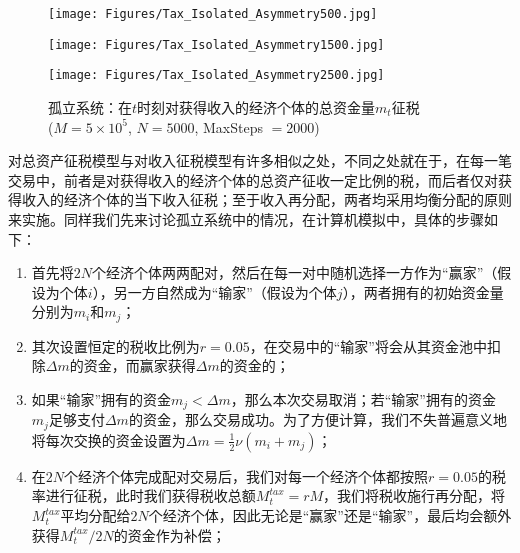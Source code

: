 \documentclass[tsinghuacite]{HustGraduPaper}
\begin{document}
		\begin{figure}[htbp]
			\centering                                                 
			\begin{minipage}[t]{0.49\textwidth}                                                      
			\texttt{[image: Figures/Tax\_Isolated\_Asymmetry500.jpg]}               
			\end{minipage}
			\begin{minipage}[t]{0.49\textwidth}                 
			\texttt{[image: Figures/Tax\_Isolated\_Asymmetry1500.jpg]}               
			\end{minipage}
			
			\begin{minipage}[t]{0.49\textwidth}                 
			\texttt{[image: Figures/Tax\_Isolated\_Asymmetry2500.jpg]}               
			\end{minipage}

			\caption{孤立系统：在$t$时刻对获得收入的经济个体的总资金量$m_t$征税 \\ ($M = 5 \times 10^5$, $N = 5000$, MaxSteps $= 2000$)} 
			\label{fig:Tax_Isolated_Asymmetry}                                                        
		\end{figure}
		
		对总资产征税模型与对收入征税模型有许多相似之处，不同之处就在于，在每一笔交易中，前者是对获得收入的经济个体的总资产征收一定比例的税，而后者仅对获得收入的经济个体的当下收入征税；至于收入再分配，两者均采用均衡分配的原则来实施。同样我们先来讨论孤立系统中的情况，在计算机模拟中，具体的步骤如下：
		
		\begin{enumerate}[label=(\roman*)]
			\item 首先将$2N$个经济个体两两配对，然后在每一对中随机选择一方作为“赢家”（假设为个体$i$），另一方自然成为“输家”（假设为个体$j$），两者拥有的初始资金量分别为$m_i$和$m_j$；
			
			\item 其次设置恒定的税收比例为$r=0.05$，在交易中的“输家”将会从其资金池中扣除$\Delta m$的资金，而赢家获得$\Delta m$的资金的；
			
			\item 如果“输家”拥有的资金$m_{j} < \Delta m$，那么本次交易取消；若“输家”拥有的资金$m_j$足够支付$\Delta m$的资金，那么交易成功。为了方便计算，我们不失普遍意义地将每次交换的资金设置为$\Delta m =  \frac{1}{2} \nu (m_i + m_j)$；
			
			\item 在$2N$个经济个体完成配对交易后，我们对每一个经济个体都按照$r=0.05$的税率进行征税，此时我们获得税收总额$M_t^{tax} = r M$，我们将税收施行再分配，将$M_t^{tax}$平均分配给$2N$个经济个体，因此无论是“赢家”还是“输家”，最后均会额外获得$M_t^{tax}/2N$的资金作为补偿；
			
		\end{enumerate}
		
\end{document}
